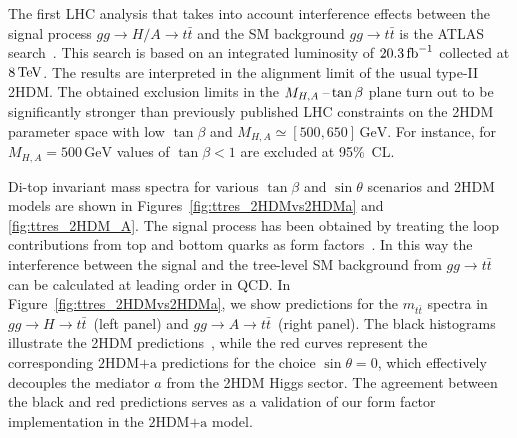 \documentclass[review]{elsarticle}
\newcommand{\hdma}{\ensuremath{\textrm{2HDM+a}}\xspace}
\begin{document}
The first LHC analysis that takes into account interference effects between the signal process $gg \to H/A \to t \bar t$ and the SM background $gg \to t \bar t$ is the ATLAS search~\cite{Aaboud:2017hnm}. This search  is based on an integrated luminosity of $20.3 \, {\rm fb}^{-1}$ collected at $8 \, {\rm TeV}$. The results are interpreted in the alignment limit of the usual type-II 2HDM. The obtained  exclusion limits in the $M_{H,A}\hspace{0.5mm}$--$\hspace{0.5mm} \tan \beta$ plane turn out to be significantly stronger than previously published LHC constraints on the 2HDM parameter space with low $\tan \beta$ and $M_{H,A} \simeq [500, 650] \, {\mathrm{GeV}}$. For instance,  for $M_{H,A} = 500 \, {\mathrm{GeV}}$ values of $\tan \beta < 1$ are excluded at 95\%~CL. 

Di-top invariant mass spectra for various $\tan \beta$ and $\sin \theta$ scenarios and 2HDM models are shown in Figures~\ref{fig:ttres_2HDMvs2HDMa} and \ref{fig:ttres_2HDM_A}. The signal process has been obtained by treating the loop contributions from top and bottom quarks as form factors~\cite{FranzosiZhang}. In this way the interference between the signal and the tree-level SM background from $gg \to t \bar t$ can be calculated at leading order in QCD. In Figure~\ref{fig:ttres_2HDMvs2HDMa}, we show predictions for the $m_{t \bar t}$ spectra in $gg \to H \to t \bar t$~(left panel) and $gg \to A \to t \bar t$~(right panel). The black histograms illustrate the 2HDM predictions~\cite{Aaboud:2017hnm}, while the red curves represent the corresponding \hdma predictions for the choice $\sin \theta = 0$, which effectively decouples the mediator $a$ from the 2HDM Higgs sector. The agreement between the black and red predictions serves as a validation of our form factor implementation in the \hdma model. 
\end{document}
